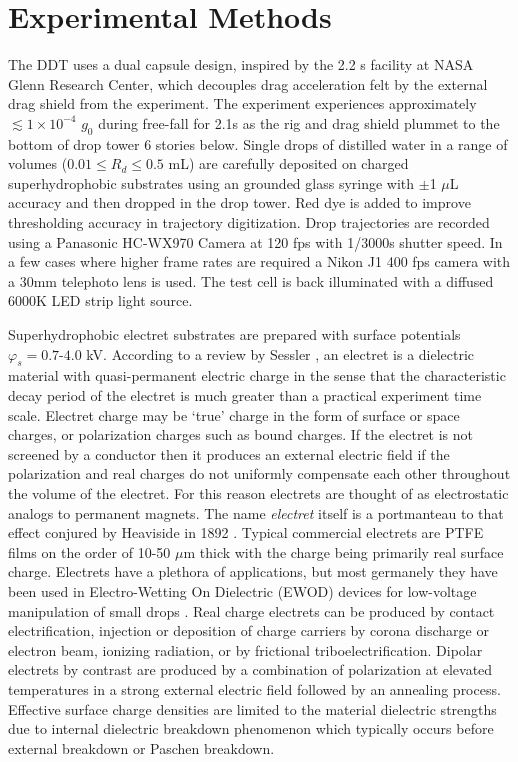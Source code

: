 \documentclass[12pt,a4paper,oneside]{book}
\begin{document}
\section{Experimental Methods}
The DDT uses a dual capsule design, inspired by the 2.2 s facility at NASA Glenn Research Center, which decouples drag acceleration felt by the external drag shield from the experiment. The experiment experiences approximately $\lesssim 1 \times 10^{-4}$ $g_0$ during free-fall for 2.1s as the rig and drag shield plummet to the bottom of drop tower 6 stories below. Single drops of distilled water in a range of volumes ($0.01 \leq R_d \leq 0.5$ mL) are carefully deposited on charged superhydrophobic substrates using an grounded glass syringe with $\pm $1 $\mu$L accuracy and then dropped in the drop tower. Red dye is added to improve thresholding accuracy in trajectory digitization. Drop trajectories are recorded using a Panasonic HC-WX970 Camera at 120 fps with 1/3000s shutter speed. In a few cases where higher frame rates are required a Nikon J1 400 fps camera with a 30mm telephoto lens is used. The test cell is back illuminated with a diffused 6000K LED strip light source.  

Superhydrophobic electret substrates are prepared with surface potentials $\varphi_s = 0.7$-$4.0$ kV. According to a review by Sessler \cite{sessler_electrets_1987}, an electret is a dielectric material with quasi-permanent electric charge in the sense that the characteristic decay period of the electret is much greater than a practical experiment time scale. Electret charge may be `true' charge in the form of surface or space charges, or polarization charges such as bound charges. If the electret is not screened by a conductor then it produces an external electric field if the polarization and real charges do not uniformly compensate each other throughout the volume of the electret. For this reason electrets are thought of as electrostatic analogs to permanent magnets. The name \emph{electret} itself is a portmanteau to that effect conjured by Heaviside in 1892 \cite{heaviside_electrical_2011}. Typical commercial electrets are PTFE films on the order of 10-50 $\mu$m thick with the charge being primarily real surface charge. Electrets have a plethora of applications, but most germanely they have been used in Electro-Wetting On Dielectric (EWOD) devices for low-voltage manipulation of small drops \cite{wu_low-voltage_2010}. Real charge electrets can be produced by contact electrification, injection or deposition of charge carriers by corona discharge or electron beam, ionizing radiation, or by frictional triboelectrification. Dipolar electrets by contrast are produced by a combination of polarization at elevated temperatures in a strong external electric field followed by an annealing process. Effective surface charge densities are limited to the material dielectric strengths due to internal dielectric breakdown phenomenon which typically occurs before external breakdown or Paschen breakdown. 
\end{document}
